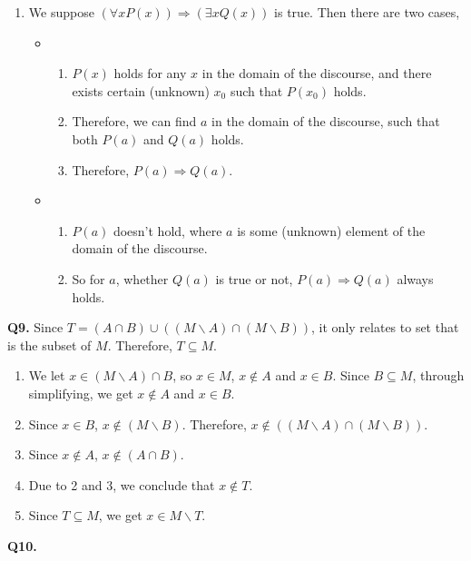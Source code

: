 \documentclass{article}[12pt]
\begin{document}
\begin{enumerate}
\item We suppose $(\forall x P(x)) \Rightarrow(\exists x Q(x))$ is true. Then there are two cases,
\begin{itemize}
\item
\begin{enumerate}
\item $P(x)$ holds for any $x$ in the domain of the discourse, and there exists certain (unknown) $x_0$ such that $P(x_0)$ holds.
\item Therefore, we can find $a$ in the domain of the discourse, such that both $P(a)$ and $Q(a)$ holds. 
\item Therefore, $P(a) \Rightarrow Q(a)$.
\end{enumerate}
\item 
\begin{enumerate}
\item $P(a) $ doesn't hold, where $a$ is some (unknown) element of the domain of the discourse. 
\item So for $a$, whether $Q(a)$ is true or not, $P(a) \Rightarrow Q(a)$ always holds. 
\end{enumerate}
\end{itemize}
\end{enumerate}


\noindent \textbf{Q9.}
Since $T=(A \cap B) \cup((M \backslash A) \cap(M \backslash B))$, it only relates to set that is the subset of $M$. Therefore, $T\subseteq M$.
\begin{enumerate}
\item We let $x\in (M \backslash A) \cap B$, so $ x\in M $, $x\not\in A$ and $x\in B$. Since $B\subseteq M$, through simplifying, we get $x\not\in A$ and $x\in B$.
\item Since $x\in B$, $x\not\in (M \backslash B)$. Therefore, $x\not\in ((M \backslash A) \cap(M \backslash B))$.
\item Since $x\not\in A$, $x\not\in (A \cap B)$.
\item Due to 2 and 3, we conclude that $x\not\in T$.
\item Since $T \subseteq M$, we get $x\in M\backslash T$.
\end{enumerate}



\noindent \textbf{Q10.}
\end{document}
